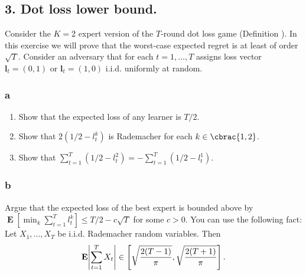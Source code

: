 \documentclass[10pt, a4paper, twoside]{amsart}
\theoremstyle{plain}
\DeclarePairedDelimiter\abs{\lvert}{\rvert}
\DeclarePairedDelimiter\cbrac\{\}
\newcommand{\Ev}{\operatorname*{\ensuremath{\mathbf{E}}}} %
\begin{document}
\subsection*{3. Dot loss lower bound.}
Consider the $K = 2$ expert version of the $T$-round dot loss game (Definition ). In this exercise we will prove that the worst-case expected regret is at least of order $\sqrt{T}$. Consider an adversary that for each $t = 1, \ldots, T$ assigns loss vector $\mathbf{l}_t = (0,1)$ or $\mathbf{l}_t = (1,0)$ i.i.d. uniformly at random.
\subsubsection*{a}
\begin{enumerate}[i]
    \item Show that the expected loss of any learner is $T/2$.
    \item Show that $2(1/2 - l^k_t)$ is Rademacher for each $k \in \cbrac{1,2}$.
    \item Show that $\sum_{t=1}^T (1/2 - l_t^2) = - \sum_{t=1}^T(1/2 - l_t^1)$.
\end{enumerate}
\subsubsection*{b} Argue that the expected loss of the best expert is bounded above by \\ 
$\Ev \left[ \min_k \sum_{t=1}^T l_t^k \right] \leq T/2 - c \sqrt{T}$ for some $c>0$. You can use the following fact: Let $X_1, \ldots , X_T$ be i.i.d. Rademacher random variables. Then
\begin{equation*}
    \Ev \abs*{\sum_{t=1}^T X_t} \in \left[ \sqrt{\frac{2(T-1)}{\pi}}, \sqrt{\frac{2(T+1)}{\pi}} \right].
\end{equation*}
\end{document}
